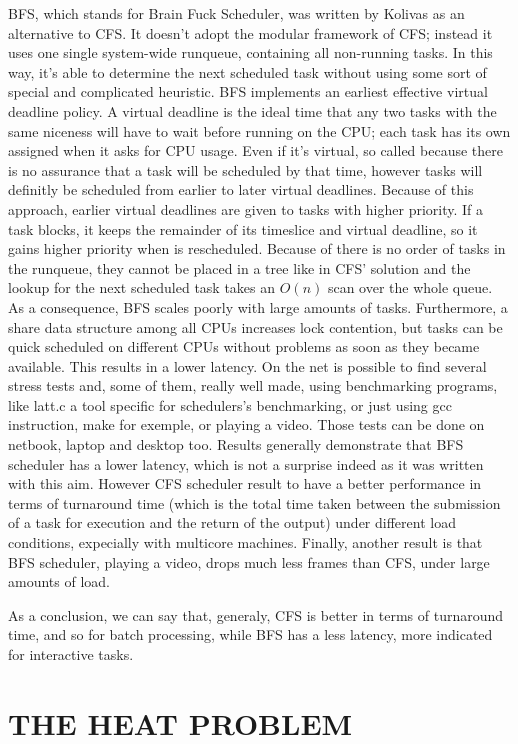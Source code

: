 \documentclass[journal]{IEEEtran}
\begin{document}
BFS, which stands for Brain Fuck Scheduler, was written by Kolivas
as an alternative to CFS. It doesn't adopt the modular framework of
CFS; instead it uses one single system-wide runqueue, containing all
non-running tasks. In this way, it's able to determine the next scheduled
task without using some sort of special and complicated heuristic.
BFS implements an earliest effective virtual deadline policy. A virtual
deadline is the ideal time that any two tasks with the same niceness
will have to wait before running on the CPU; each task has its own
assigned when it asks for CPU usage. Even if it's virtual, so called
because there is no assurance that a task will be scheduled by that
time, however tasks will definitly be scheduled from earlier to later
virtual deadlines. Because of this approach, earlier virtual deadlines
are given to tasks with higher priority. If a task blocks, it keeps
the remainder of its timeslice and virtual deadline, so it gains higher
priority when is rescheduled. Because of there is no order of tasks
in the runqueue, they cannot be placed in a tree like in CFS' solution
and the lookup for the next scheduled task takes an $O\left(n\right)$
scan over the whole queue. As a consequence, BFS scales poorly with
large amounts of tasks. Furthermore, a share data structure among
all CPUs increases lock contention, but tasks can be quick scheduled
on different CPUs without problems as soon as they became available.
This results in a lower latency.\medskip{}
On the net is possible to find several stress tests and, some of them,
really well made, using benchmarking programs, like latt.c a tool
specific for schedulers's benchmarking, or just using gcc instruction,
make for exemple, or playing a video. Those tests can be done on netbook,
laptop and desktop too. Results generally demonstrate that BFS scheduler
has a lower latency, which is not a surprise indeed as it was written
with this aim. However CFS scheduler result to have a better performance
in terms of turnaround time (which is the total time taken between
the submission of a task for execution and the return of the output)
under different load conditions, expecially with multicore machines.
Finally, another result is that BFS scheduler, playing a video, drops
much less frames than CFS, under large amounts of load.

As a conclusion, we can say that, generaly, CFS is better in terms
of turnaround time, and so for batch processing, while BFS has a less
latency, more indicated for interactive tasks.


\section{THE HEAT PROBLEM}
\end{document}
